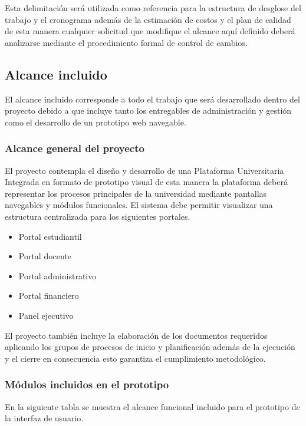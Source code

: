 \documentclass[11pt,spanish]{article}
\begin{document}
Esta delimitación será utilizada como referencia para la estructura de desglose del trabajo y el cronograma además de la estimación de costos y el plan de calidad de esta manera cualquier solicitud que modifique el alcance aquí definido deberá analizarse mediante el procedimiento formal de control de cambios.

\subsection{Alcance incluido}

El alcance incluido corresponde a todo el trabajo que será desarrollado dentro del proyecto debido a que incluye tanto los entregables de administración y gestión como el desarrollo de un prototipo web navegable.

\subsubsection{Alcance general del proyecto}

El proyecto contempla el diseño y desarrollo de una Plataforma Universitaria Integrada en formato de prototipo visual de esta manera la plataforma deberá representar los procesos principales de la universidad mediante pantallas navegables y módulos funcionales. El sistema debe permitir visualizar una estructura centralizada para los siguientes portales.

\begin{itemize}
    \item Portal estudiantil
    \item Portal docente
    \item Portal administrativo
    \item Portal financiero
    \item Panel ejecutivo
\end{itemize}

El proyecto también incluye la elaboración de los documentos requeridos aplicando los grupos de procesos de inicio y planificación además de la ejecución y el cierre en consecuencia esto garantiza el cumplimiento metodológico.

\subsubsection{Módulos incluidos en el prototipo}

En la siguiente tabla se muestra el alcance funcional incluido para el prototipo de la interfaz de usuario.
\end{document}
